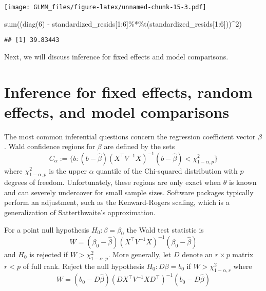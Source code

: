 \documentclass[
]{book}
\newenvironment{Shaded}{\begin{snugshade}}{\end{snugshade}}
\newcommand{\DecValTok}[1]{\textcolor[rgb]{0.00,0.00,0.81}{#1}}
\newcommand{\FunctionTok}[1]{\textcolor[rgb]{0.00,0.00,0.00}{#1}}
\newcommand{\NormalTok}[1]{#1}
\newcommand{\SpecialCharTok}[1]{\textcolor[rgb]{0.00,0.00,0.00}{#1}}
\begin{document}
\texttt{[image: GLMM\_files/figure-latex/unnamed-chunk-15-3.pdf]}

\begin{Shaded}
\begin{Highlighting}[]
\FunctionTok{sum}\NormalTok{((}\FunctionTok{diag}\NormalTok{(}\DecValTok{6}\NormalTok{) }\SpecialCharTok{{-}}\NormalTok{ standardized\_resids[}\DecValTok{1}\SpecialCharTok{:}\DecValTok{6}\NormalTok{]}\SpecialCharTok{\%*\%}\FunctionTok{t}\NormalTok{(standardized\_resids[}\DecValTok{1}\SpecialCharTok{:}\DecValTok{6}\NormalTok{]))}\SpecialCharTok{\^{}}\DecValTok{2}\NormalTok{)}
\end{Highlighting}
\end{Shaded}

\begin{verbatim}
## [1] 39.83443
\end{verbatim}

Next, we will discuss inference for fixed effects and model comparisons.

\hypertarget{inference-for-fixed-effects-random-effects-and-model-comparisons}{%
\section{Inference for fixed effects, random effects, and model comparisons}\label{inference-for-fixed-effects-random-effects-and-model-comparisons}}

The most common inferential questions concern the regression coefficient vector \(\beta\). Wald confidence regions for \(\beta\) are defined by the sets
\[C_\alpha := \{b: (b - \hat\beta)(X^\top V^{-1}X)^{-1}(b - \hat\beta)<\chi^2_{1-\alpha, p}\}\]
where \(\chi^2_{1-\alpha, p}\) is the upper \(\alpha\) quantile of the Chi-squared distribution with \(p\) degrees of freedom. Unfortunately, these regions are only exact when \(\theta\) is known and can severely undercover for small sample sizes. Software packages typically perform an adjustment, such as the Kenward-Rogers scaling, which is a generalization of Satterthwaite's approximation.

For a point null hypothesis \(H_0: \beta = \beta_{0}\) the Wald test statistic is
\[W = (\beta_0 - \hat\beta)(X^\top V^{-1}X)^{-1}(\beta_0 - \hat\beta)\]
and \(H_0\) is rejected if \(W > \chi^2_{1-\alpha, p}\). More generally, let \(D\) denote an \(r\times p\) matrix \(r<p\) of full rank. Reject the null hypothesis \(H_0:D\beta = b_0\) if \(W > \chi^2_{1-\alpha, r}\) where
\[W = (b_0 - D\hat\beta)(D X^\top V^{-1}X D^\top)^{-1}(b_0 - D\hat\beta)\]
\end{document}
